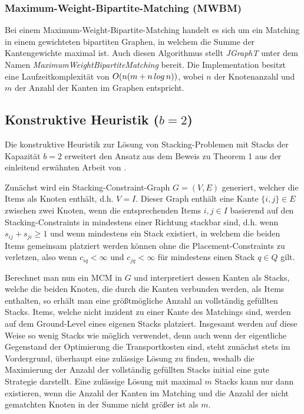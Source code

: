 \subsubsection{Maximum-Weight-Bipartite-Matching (MWBM)}
\label{sec:digression_mwbm}

Bei einem Maximum-Weight-Bipartite-Matching handelt es sich um ein Matching in einem gewichteten bipartiten Graphen,
in welchem die Summe der Kantengewichte maximal ist. Auch diesen Algorithmus stellt \textit{JGraphT} \cite{JGraphT}
unter dem Namen \textit{MaximumWeightBipartiteMatching} bereit.
Die Implementation besitzt eine Laufzeitkomplexität von $O(n (m + n \thinspace log \thinspace n))$, wobei $n$ der Knotenanzahl
und $m$ der Anzahl der Kanten im Graphen entspricht.

\subsection{Konstruktive Heuristik ($b = 2$)}
\label{sec:two_cap_heuristic}

Die konstruktive Heuristik zur Lösung von Stacking-Problemen mit Stacks der Kapazität $b=2$ erweitert den Ansatz aus dem Beweis
zu Theorem 1 aus der einleitend erwähnten Arbeit von \citet{Bruns2015}.

Zunächst wird ein Stacking-Constraint-Graph $G = (V, E)$ generiert, welcher die Items als Knoten enthält, d.h. $V = I$. Dieser Graph
enthält eine Kante $\{i, j\} \in E$ zwischen zwei Knoten, wenn die entsprechenden Items $i, j \in I$ basierend auf den Stacking-Constraints
in mindestens einer Richtung stackbar sind, d.h. wenn $s_{ij} + s_{ji} \geq 1$ und wenn mindestens ein Stack existiert, in welchem die beiden Items gemeinsam platziert werden können ohne die Placement-Constraints zu verletzen, also wenn $c_{iq} < \infty$ und $c_{jq} < \infty$ für
mindestens einen Stack $q \in Q$ gilt.

Berechnet man nun ein \textsc{MCM} in $G$ und interpretiert dessen Kanten als Stacks, welche die beiden Knoten, die durch
die Kanten verbunden werden, als Items enthalten, so erhält man eine größtmögliche Anzahl an vollständig gefüllten Stacks.
Items, welche nicht inzident zu einer Kante des Matchings sind, werden auf dem Ground-Level eines eigenen Stacks platziert.
Insgesamt werden auf diese Weise so wenig Stacks wie möglich verwendet, denn auch wenn der eigentliche Gegenstand der Optimierung die Transportkosten sind, steht zunächst stets im Vordergrund, überhaupt eine zulässige Lösung zu finden, weshalb die Maximierung der Anzahl der vollständig gefüllten Stacks initial eine gute Strategie darstellt.
Eine zulässige Lösung mit maximal $m$ Stacks kann nur dann existieren, wenn die Anzahl der Kanten im Matching und die Anzahl der nicht gematchten Knoten in der Summe nicht größer ist als $m$.

